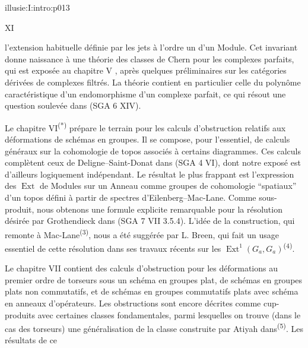 \IllusieSetPhysicalPageSize{450.6bp}{704bp}
\begin{illusiefrontpage}{illusie:I:intro:p013}{}
\begin{center}\fontsize{10}{12}\selectfont XI\end{center}
\vspace{12bp}
\hypertarget{illusie:I:intro:p013:p1}{}%
l'extension habituelle définie par les jets à l'ordre un d'un Module. Cet invariant
donne naissance à une théorie des classes de Chern pour les complexes parfaits,
qui est exposée au chapitre V , après quelques préliminaires sur les catégories
dérivées de complexes filtrés. La théorie contient en particulier celle du
polynôme caractéristique d'un endomorphisme d'un complexe parfait, ce qui résout
une question soulevée dans (SGA 6 XIV).

\vspace{4bp}
\hypertarget{illusie:I:intro:p013:p2}{}%
Le chapitre VI\textsuperscript{(*)} prépare le terrain pour les calculs
d'obstruction relatifs aux déformations de schémas en groupes. Il se compose,
pour l'essentiel, de calculs généraux sur la cohomologie de topos associés à
certains diagrammes. Ces calculs complètent ceux de Deligne--Saint-Donat dans
(SGA 4 VI), dont notre exposé est d'ailleurs logiquement indépendant. Le résultat
le plus frappant est l'expression des $\operatorname{Ext}$ de Modules sur un
Anneau comme groupes de cohomologie ``spatiaux'' d'un topos défini à partir de
spectres d'Eilenberg--Mac-Lane. Comme sous-produit, nous obtenons une formule
explicite remarquable pour la résolution désirée par Grothendieck dans
(SGA 7 VII 3.5.4). L'idée de la construction, qui remonte à
Mac-Lane\textsuperscript{(3)}, nous a été suggérée par L. Breen, qui fait un usage
essentiel de cette résolution dans ses travaux récents sur les
$\operatorname{Ext}^{1}(G_a,G_a)$\textsuperscript{(4)}.

\vspace{4bp}
\hypertarget{illusie:I:intro:p013:p3}{}%
Le chapitre VII contient des calculs d'obstruction pour les déformations au
premier ordre de torseurs sous un schéma en groupes plat, de schémas en groupes
plats non commutatifs, et de schémas en groupes commutatifs plats avec schéma en
anneaux d'opérateurs. Les obstructions sont encore décrites comme cup-produits
avec certaines classes fondamentales, parmi lesquelles on trouve (dans le cas des
torseurs) une généralisation de la classe construite par Atiyah
dans\textsuperscript{(5)}. Les résultats de ce

\IllusieNoteRule
{}\hypertarget{illusie:I:intro:p013:ns}{}%
\hypertarget{illusie:I:intro:p013:n3}{}%
\hypertarget{illusie:I:intro:p013:n4}{}%
\hypertarget{illusie:I:intro:p013:n5}{}%
\end{illusiefrontpage}
